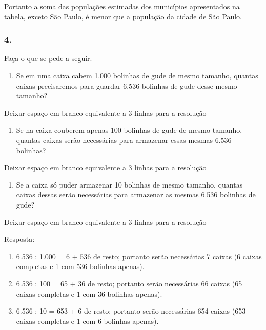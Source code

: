 \begin{enumerate}
Portanto a soma das populações estimadas dos municípios apresentados na
tabela, exceto São Paulo, é menor que a população da cidade de São
Paulo.

\subsubsection{4.}\label{section-16}

Faça o que se pede a seguir.

\begin{enumerate}
\def\labelenumi{\alph{enumi})}
\item
  Se em uma caixa cabem 1.000 bolinhas de gude de mesmo tamanho, quantas
  caixas precisaremos para guardar 6.536 bolinhas de gude desse mesmo
  tamanho?
\end{enumerate}

Deixar espaço em branco equivalente a 3 linhas para a resolução

\begin{enumerate}
\def\labelenumi{\alph{enumi})}
\item
  Se na caixa couberem apenas 100 bolinhas de gude de mesmo tamanho, quantas
  caixas serão necessárias para armazenar essas mesmas 6.536 bolinhas?
\end{enumerate}

Deixar espaço em branco equivalente a 3 linhas para a resolução

\begin{enumerate}
\def\labelenumi{\alph{enumi})}
\item
  Se a caixa só puder armazenar 10 bolinhas de mesmo tamanho, quantas caixas dessas
  serão necessárias para armazenar as mesmas 6.536 bolinhas de gude?
\end{enumerate}

Deixar espaço em branco equivalente a 3 linhas para a resolução

Resposta:

\begin{enumerate}
\def\labelenumi{\alph{enumi})}
\item
  6.536 : 1.000 = 6 + 536 de resto; portanto serão necessárias 7 caixas
  (6 caixas completas e 1 com 536 bolinhas apenas).
\item
  6.536 : 100 = 65 + 36 de resto; portanto serão necessárias 66 caixas
  (65 caixas completas e 1 com 36 bolinhas apenas).
\item
  6.536 : 10 = 653 + 6 de resto; portanto serão necessárias 654 caixas
  (653 caixas completas e 1 com 6 bolinhas apenas).
\end{enumerate}


\end{enumerate}
